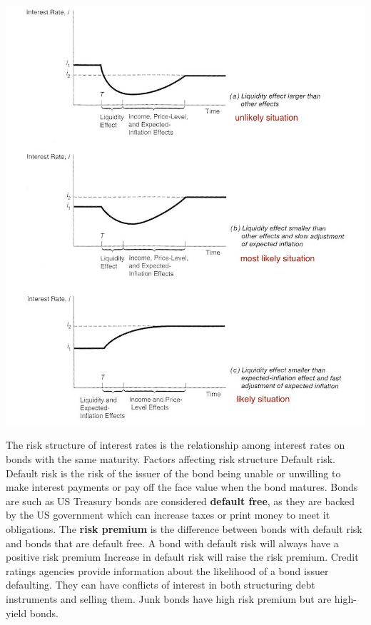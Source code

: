 \documentclass[12pt]{examnotes}
\begin{document}

\includegraphics[scale=0.5]{./imgs/58.jpg}



\ra The risk structure of interest rates is the relationship among interest rates on bonds with the same maturity.
 Factors affecting risk structure 
 Default risk. 
\rna Default risk is the risk of the issuer of the bond being unable or unwilling to make interest payments or pay off the face value when the bond matures.  
\rna Bonds are such as US Treasury bonds are considered {\bf default free}, as they are backed by the US government which can increase taxes or print money to meet it obligations. 
\rna The {\bf risk premium} is the difference between bonds with default risk and bonds that are default free. 
\rna A bond with default risk will always have a positive risk premium 
\rna Increase in default risk will raise the risk premium. 
\rna Credit ratings agencies provide information about the likelihood of a bond issuer defaulting. They can have conflicts of interest in both structuring debt instruments and selling them. Junk bonds have high risk premium but are high-yield bonds.
\end{document}
